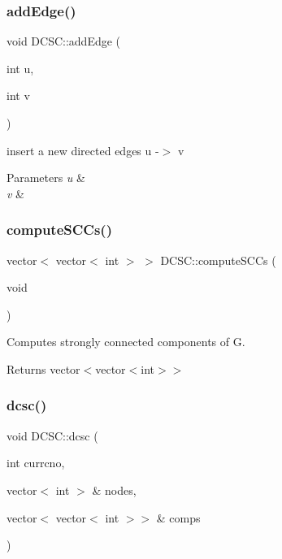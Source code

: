 \subsubsection{\texorpdfstring{add\+Edge()}{addEdge()}}
{\footnotesize\ttfamily void D\+C\+S\+C\+::add\+Edge (\begin{DoxyParamCaption}\item[{int}]{u,  }\item[{int}]{v }\end{DoxyParamCaption})}



insert a new directed edges u -\/$>$ v 


\begin{DoxyParams}{Parameters}
{\em u} & \\
\hline
{\em v} & \\
\hline
\end{DoxyParams}
\mbox{\label{classDCSC_a287ebcdb5c7588d274e0b9574af0451e}} 
\subsubsection{\texorpdfstring{compute\+S\+C\+Cs()}{computeSCCs()}}
{\footnotesize\ttfamily vector$<$ vector$<$ int $>$ $>$ D\+C\+S\+C\+::compute\+S\+C\+Cs (\begin{DoxyParamCaption}\item[{void}]{ }\end{DoxyParamCaption})}



Computes strongly connected components of G. 

\begin{DoxyReturn}{Returns}
vector$<$vector$<$int$>$$>$ 
\end{DoxyReturn}
\mbox{\label{classDCSC_af9ebb39c172ff579794d33bc1d8f67d2}} 
\subsubsection{\texorpdfstring{dcsc()}{dcsc()}}
{\footnotesize\ttfamily void D\+C\+S\+C\+::dcsc (\begin{DoxyParamCaption}\item[{int}]{currcno,  }\item[{vector$<$ int $>$ \&}]{nodes,  }\item[{vector$<$ vector$<$ int $>$$>$ \&}]{comps }\end{DoxyParamCaption})\hspace{0.3cm}{\ttfamily [private]}}



